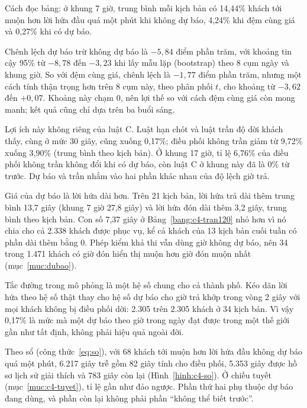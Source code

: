 Cách đọc bảng: ở khung 7 giờ, trung bình mỗi kịch bản có 14,44\% khách tới muộn hơn lời hứa đầu quá một phút khi
không dự báo, 4,24\% khi đệm cùng giá và 0,27\% khi có dự báo.

Chênh lệch dự báo trừ không dự báo là $-5{,}84$ điểm phần trăm, với khoảng tin cậy 95\% từ $-8{,}78$ đến
$-3{,}23$ khi lấy mẫu lặp (bootstrap) theo 8 cụm ngày và khung giờ. So với đệm cùng giá, chênh lệch là $-1{,}77$
điểm phần trăm, nhưng một cách tính thận trọng hơn trên 8 cụm này, theo phân phối $t$, cho khoảng từ $-3{,}62$
đến $+0{,}07$. Khoảng này chạm 0, nên lợi thế so với cách đệm cùng giá còn mong manh; kết quả cũng chỉ dựa trên
ba buổi sáng.

Lợi ích này không riêng của luật C. Luật hạn chót và luật trần độ dời khách thấy, cùng ở mức 30 giây, cũng xuống
0,17\%; điều phối không trần giảm từ 9,72\% xuống 3,90\% (trung bình theo kịch bản). Ở khung 17 giờ, tỉ lệ 6,76\%
của điều phối không trần không đổi khi có dự báo, còn luật C ở khung này đã là 0\% từ trước. Dự báo và trần nhắm
vào hai phần khác nhau của độ lệch giờ trả.

Giá của dự báo là lời hứa dài hơn. Trên 21 kịch bản, lời hứa trả dài thêm trung bình 13,7 giây (khung 7 giờ 27,8
giây) và lời hứa đón dài thêm 3,2 giây, trung bình theo kịch bản. Con số 7,37 giây ở Bảng~\ref{bang:c4-tran120} nhỏ
hơn vì nó chia cho cả 2.338 khách được phục vụ, kể cả khách của 13 kịch bản cuối tuần có phần dài thêm bằng 0.
Phép kiểm khả thi vẫn dùng giờ không dự báo, nên 34 trong 1.471 khách có giờ đón hiển thị muộn hơn giờ đón muộn
nhất (mục~\ref{muc:dubao}).

Tắc đường trong mô phỏng là một hệ số chung cho cả thành phố. Kéo dãn lời hứa theo hệ số thật thay cho hệ số dự
báo cho giờ trả khớp trong vòng 2 giây với mọi khách không bị điều phối dời: 2.305 trên 2.305 khách ở 34 kịch bản.
Vì vậy 0,17\% là mức mà một dự báo theo giờ trong ngày đạt được trong một thế giới gần như tất định, không phải
hiệu quả ngoài đời.

Theo sổ (công thức~\eqref{eq:so}), với 68 khách tới muộn hơn lời hứa đầu không dự báo quá một phút, 6.217 giây trễ
gồm 82 giây tính cho điều phối, 5.353 giây được hồ sơ lịch sử giải thích và 783 giây còn lại
(Hình~\ref{hinh:c4-so}). Ở chiều tuyết (mục~\ref{muc:c4-tuyet}), tỉ lệ gần như đảo ngược. Phần thứ hai phụ thuộc
dự báo đang dùng, và phần còn lại không phải phần ``không thể biết trước''.

